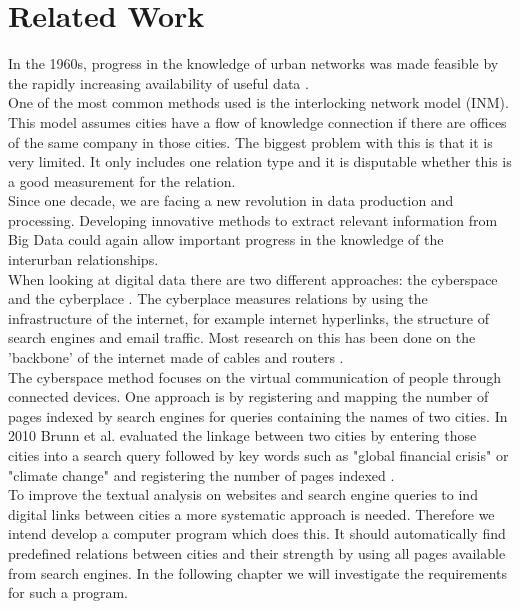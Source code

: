 \section{Related Work}
In the 1960s, progress in the knowledge of urban networks was made feasible by the rapidly increasing availability of useful data \cite{tornqvist1968flows}. \\
One of the most common methods used is the interlocking network model (INM)\cite{taylor2012interlocking}. This model assumes cities have a flow of knowledge connection if there are offices of the same company in those cities. The biggest problem with this is that it is very limited. It only includes one relation type and it is disputable whether this is a good measurement for the relation. \\

Since one decade, we are facing a new revolution in data production and processing. Developing innovative methods to extract relevant information from Big Data could again allow important progress in the knowledge of the interurban relationships. \\

When looking at digital data there are two different approaches: the cyberspace and the cyberplace \cite{devriendt2008cyberplace}. The cyberplace measures relations by using the infrastructure of the internet, for example internet hyperlinks, the structure of search engines and email traffic. Most research on this has been done on the 'backbone' of the internet made of cables and routers \cite{choi2006comparing, gorman2000networks}. \\

The cyberspace method focuses on the virtual communication of people through connected devices. One approach is by registering and mapping the number of pages indexed by search engines for queries containing the names of two cities\cite{devriendt2008cyberplace, janc2015visibility, janc2015geography}. In 2010 Brunn et al. evaluated the linkage between two cities by entering those cities into a search query followed by key words such as "global financial crisis" or "climate change" and registering the number of pages indexed \cite{brunn2010networks}. \\

To improve the textual analysis on websites and search engine queries to ind digital links between cities a more systematic approach is needed.  Therefore we intend develop a computer program which does this. It should automatically find predefined relations between cities and their strength by using all pages available from search engines. In the following chapter we will investigate the requirements for such a program.

